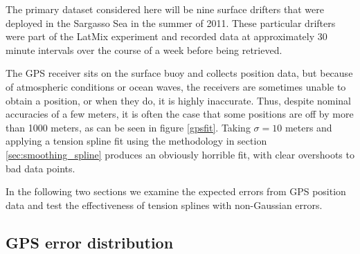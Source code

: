 \documentclass[10pt,journal]{IEEEtran}
\begin{document}
The primary dataset considered here will be nine surface drifters that were deployed in the Sargasso Sea in the summer of 2011. These particular drifters were part of the LatMix experiment \cite{shcherbina2015-bams} and recorded data at approximately 30 minute intervals over the course of a week before being retrieved.

The GPS receiver sits on the surface buoy and collects position data, but because of atmospheric conditions or ocean waves, the receivers are sometimes unable to obtain a position, or when they do, it is highly inaccurate. Thus, despite nominal accuracies of a few meters, it is often the case that some positions are off by more than 1000 meters, as can be seen in figure \ref{gpsfit}. Taking $\sigma=10$ meters and applying a tension spline fit using the methodology in section \ref{sec:smoothing_spline} produces an obviously horrible fit, with clear overshoots to bad data points.

In the following two sections we examine the expected errors from GPS position data and test the effectiveness of tension splines with non-Gaussian errors.

%
\subsection{GPS error distribution}
\label{gps_position_errors}
%
\end{document}
